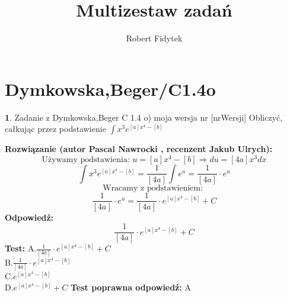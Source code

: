 \documentclass[12pt, a4paper]{article}
\title{Multizestaw zadań}
\author{Robert Fidytek}
\date{}
\theoremstyle{definition} %
\newtheorem{zad}{}
\newcommand{\kategoria}[1]{\section{#1}} %
\newcommand{\zadStart}[1]{\begin{zad}#1\newline} %
\newcommand{\zadStop}{\end{zad}}   %
\newcommand{\rozwStart}[2]{\noindent \textbf{Rozwiązanie (autor #1 , recenzent #2): }\newline} %
\newcommand{\odpStart}{\noindent \textbf{Odpowiedź:}\newline}    %
\newcommand{\odpStop}{\newline}                                             %
\newcommand{\testStart}{\noindent \textbf{Test:}\newline} %
\newcommand{\testStop}{\newline} %
\newcommand{\kluczStart}{\noindent \textbf{Test poprawna odpowiedź:}\newline} %
\newcommand{\kluczStop}{\newline} %
\begin{document}
\maketitle



\kategoria{Dymkowska,Beger/C1.4o}
\zadStart{Zadanie z Dymkowska,Beger C 1.4 o) moja wersja nr [nrWersji]}
Obliczyć, całkując przez podstawienie $\displaystyle \int x^{3}e^{[a]x^{4}-[b]}$
\zadStop
\rozwStart{Pascal Nawrocki}{Jakub Ulrych}
$$\text{Używamy podstawienia: }u=[a]x^{4}-[b]\Rightarrow du=[4a]x^{3}dx$$
$$\displaystyle \int x^{3}e^{[a]x^{4}-[b]}=\displaystyle \frac{1}{[4a]}\int e^{u}=\frac{1}{[4a]}\cdot e^{u}$$
$$\text{Wracamy z podstawieniem: }$$
$$\frac{1}{[4a]}\cdot e^{u}=\frac{1}{[4a]}\cdot e^{[a]x^{4}-[b]}+C$$
\odpStart
$$\frac{1}{[4a]}\cdot e^{[a]x^{4}-[b]}+C$$
\odpStop
\testStart
A.$\frac{1}{[4a]}\cdot e^{[a]x^{4}-[b]}+C$
\\
B.$\frac{1}{[4a]}\cdot e^{[a]x^{4}-[b]}$
\\
C.$e^{[a]x^{4}-[b]}$
\\
D.$e^{[a]x^{4}-[b]}+C$
\testStop
\kluczStart
A
\kluczStop
\end{document}

